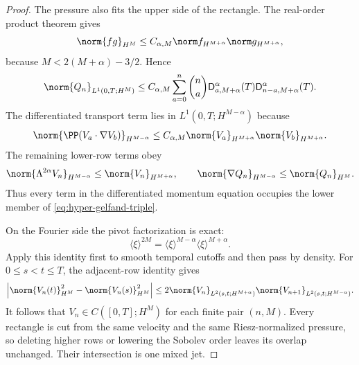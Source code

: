\begin{proof}
The pressure also fits the upper side of the rectangle.  The real-order
product theorem gives
\begin{equation}
 \norm{fg}_{H^M}
 \le C_{\alpha,M}
 \norm f_{H^{M+\alpha}}\norm g_{H^{M+\alpha}},
 \label{eq:hyper-rectangle-product}
\end{equation}
because \(M<2(M+\alpha)-3/2\).  Hence
\begin{equation}
 \norm{Q_n}_{L^1(0,T;H^M)}
 \le C_{\alpha,M}\sum_{a=0}^n\binom na
 \mathsf D_{a,M+\alpha}^\alpha(T)
 \mathsf D_{n-a,M+\alpha}^\alpha(T).
 \label{eq:hyper-rectangle-pressure}
\end{equation}
The differentiated transport term lies in
\(L^1(0,T;H^{M-\alpha})\) because
\begin{equation}
 \norm{\PP(V_a\cdot\nabla V_b)}_{H^{M-\alpha}}
 \le C_{\alpha,M}
 \norm{V_a}_{H^{M+\alpha}}
 \norm{V_b}_{H^{M+\alpha}}.
 \label{eq:hyper-lower-transport}
\end{equation}
The remaining lower-row terms obey
\begin{equation}
 \norm{\Lambda^{2\alpha}V_n}_{H^{M-\alpha}}
 \le\norm{V_n}_{H^{M+\alpha}},
 \qquad
 \norm{\nabla Q_n}_{H^{M-\alpha}}
 \le\norm{Q_n}_{H^M}.
 \label{eq:hyper-lower-linear-pressure}
\end{equation}
Thus every term in the differentiated momentum equation occupies the lower member of
\eqref{eq:hyper-gelfand-triple}.

On the Fourier side the pivot factorization is exact:
\begin{equation}
 \langle\xi\rangle^{2M}
 =\langle\xi\rangle^{M-\alpha}
  \langle\xi\rangle^{M+\alpha}.
 \label{eq:hyper-pivot-factorization}
\end{equation}
Apply this identity first to smooth temporal cutoffs and then pass by density.
For \(0\le s<t\le T\), the adjacent-row identity gives
\begin{equation}
 \left|
  \norm{V_n(t)}_{H^M}^2-\norm{V_n(s)}_{H^M}^2
 \right|
 \le2\norm{V_n}_{L^2(s,t;H^{M+\alpha})}
       \norm{V_{n+1}}_{L^2(s,t;H^{M-\alpha})}.
 \label{eq:hyper-adjacent-trace}
\end{equation}
It follows that \(V_n\in C([0,T];H^M)\) for each finite pair \((n,M)\).
Every rectangle is cut from the same velocity and the same Riesz-normalized
pressure, so deleting higher rows or lowering the Sobolev order leaves its
overlap unchanged.  Their intersection is one mixed jet.


\end{proof}
